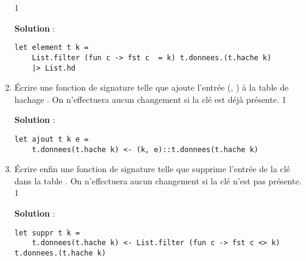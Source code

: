 \documentclass[10pt,a4paper, varwidth]{article}
\def\cor{1}
\begin{document}
\begin{enumerate}
        \if\cor1
        \begin{emphase}
            \textbf{Solution} : 
            \begin{center}
                \begin{minipage}{.8\textwidth}
                \begin{verbatim}
let element t k =
    List.filter (fun c -> fst c  = k) t.donnees.(t.hache k)
    |> List.hd 
                \end{verbatim}
                \end{minipage}
            \end{center}
        \end{emphase}
        \fi
		\item Écrire une fonction  de signature  telle que  ajoute l'entrée (, ) à la table de hachage . On n'effectuera aucun changement si la clé est déjà présente.
		\if\cor1
        \begin{emphase}
            \textbf{Solution} : 
            \begin{center}
                \begin{minipage}{.8\textwidth}
                \begin{verbatim}
let ajout t k e =
    t.donnees(t.hache k) <- (k, e)::t.donnees(t.hache k)
                \end{verbatim}
                \end{minipage}
            \end{center}
        \end{emphase}
        \fi
		\item Écrire enfin une fonction  de signature  telle que  supprime l'entrée de la clé  dans la table . On n'effectuera aucun changement si la clé n'est pas présente.
		\if\cor1
        \begin{emphase}
            \textbf{Solution} : 
            \begin{center}
                \begin{minipage}{\textwidth}
                \begin{verbatim}
let suppr t k =
    t.donnees(t.hache k) <- List.filter (fun c -> fst c <> k) t.donnees.(t.hache k)
                \end{verbatim}
                \end{minipage}
            \end{center}
        \end{emphase}
        \fi
	\end{enumerate}
		
\end{document}
